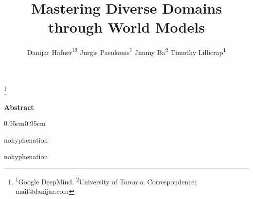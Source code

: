 \documentclass[12pt]{article}
\title{\vspace*{-2.5ex}\bfseries Mastering Diverse Domains through World Models}
\date{}
\author{
Danijar Hafner\rlap{,}\textsuperscript{12}\enskip
Jurgis Pasukonis\rlap{,}\textsuperscript{1}\enskip
Jimmy Ba\rlap{,}\textsuperscript{2}\enskip
Timothy Lillicrap\textsuperscript{1}}
\begin{document}
\pagestyle{fancy}

\vspace{-4ex}
\maketitle
\thispagestyle{first}

\enlargethispage{1.5\baselineskip}
{\renewcommand\thefootnote{}\footnote{
\textsuperscript{1}Google DeepMind.\enskip
\textsuperscript{2}University of Toronto.\enskip
Correspondence: mail@danijar.com}}
\addtocounter{footnote}{-1}

\vspace{-6ex}
\begin{center}\bfseries
\vspace{-.5ex}
Abstract
\vspace{-.2ex}
\end{center}
\begin{adjustwidth}{0.95cm}{0.95cm}
\begin{hyphenrules}{nohyphenation}
\ignorespaces

\end{hyphenrules}
\end{adjustwidth}
\vspace{2ex}

\vfill

\vfill
\clearpage








\clearpage
\begin{hyphenrules}{nohyphenation}
\setlength{\bibsep}{.5ex plus .8ex}

\end{hyphenrules}

\clearpage
\appendix


\end{document}
